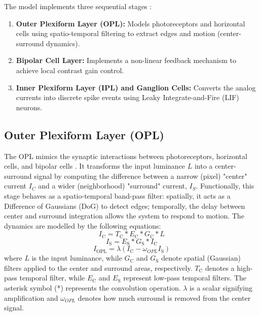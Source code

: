\documentclass{article}
\begin{document}
\newpage
The model implements three sequential stages : 
\begin{enumerate}
    \item \textbf{Outer Plexiform Layer (OPL):} Models photoreceptors and horizontal cells using spatio-temporal filtering to extract edges and motion (center-surround dynamics).
    \item \textbf{Bipolar Cell Layer:} Implements a non-linear feedback mechanism to achieve local contrast gain control.
    \item \textbf{Inner Plexiform Layer (IPL) and Ganglion Cells:} Converts the analog currents into discrete spike events using Leaky Integrate-and-Fire (LIF) neurons.
\end{enumerate}

\subsection{Outer Plexiform Layer (OPL)}
The OPL mimics the synaptic interactions between photoreceptors, horizontal cells, and bipolar cells \cite{wohrer_virtual_2009}. It transforms the input luminance $L$ into a center-surround signal by computing the difference between a narrow (pixel) "center" current $I_C$ and a wider (neighborhood) "surround" current, $I_S$.
Functionally, this stage behaves as a spatio-temporal band-pass filter: spatially, it acts as a Difference of Gaussians (DoG) to detect edges; temporally, the delay between center and surround integration allows the system to respond to motion. The dynamics are modelled by the following equations:
\begin{equation}
 I_\text{C}=T_\text{C}* E_\text{C}*G_\text{C}*L
 \label{c1}
\end{equation}
\begin{equation}
  I_\text{S}=E_\text{S}*G_\text{S}*I_\text{C}
  \label{s1}
\end{equation}
 \begin{equation}
 I_\text{OPL}= \lambda(I_\text{C} - \omega_{OPL} I_\text{S}) 
 \label{opleq}
 \end{equation}
  where $L$ is the input luminance, while $G_\text{C}$ and $G_\text{S}$ denote spatial (Gaussian) filters applied to the center and surround areas, respectively. $T_\text{C}$ denotes a high-pass temporal filter, while $E_\text{C}$ and $E_\text{S}$ represent low-pass temporal filters. The asterisk symbol (*) represents the convolution operation. $\lambda$ is a scalar signifying amplification and $\omega_{OPL}$ denotes how much surround is removed from the center signal.  
\end{document}
